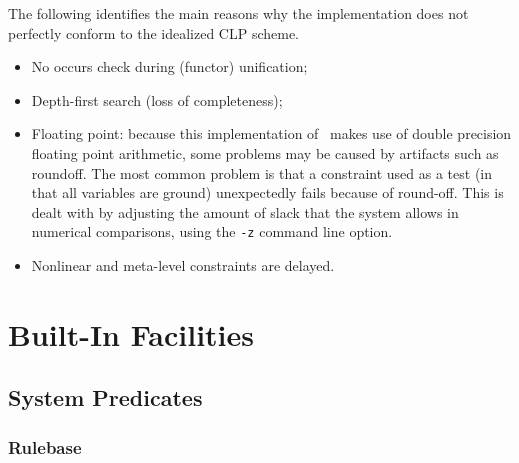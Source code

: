 The following identifies the main reasons why the \CLPR{} implementation
does not perfectly conform to the idealized CLP scheme. 
\begin{itemize}
\item No occurs check during (functor) unification;
\item Depth-first search (loss of completeness);
\item Floating point:
because this implementation of \CLPR\ makes use of double precision floating
point arithmetic, some problems may be caused by artifacts such as roundoff.
The most common problem is that a constraint used as a test (in that all
variables are ground) unexpectedly fails because of round-off. This is dealt
with by adjusting the amount of slack that the system allows in numerical
comparisons, using the {\tt -z} command line option.
\item Nonlinear and meta-level constraints are delayed.
\end{itemize}

\chapter{Built-In Facilities}

\section{System Predicates}

\subsection{Rulebase}

